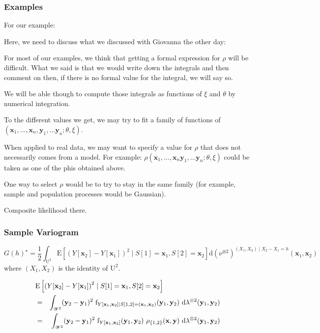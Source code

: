 \documentclass[12pt]{article}
\theoremstyle{definition}
\theoremstyle{remark}
\newcommand{\range}[1]{\mathscr{#1}}
\newcommand{\dominantU}{\nu}
\newcommand{\dominantY}{\lambda}
\newcommand{\derive}{\mathrm{d}}
\newcommand{\E}{\mathrm{E}}
\newcommand{\density}{\mathrm{f}}
\newcommand{\Semivariogram}{G}
\newcommand{\Sample}{S}
\newcommand{\Pop}{\mathrm{U}}
\newcommand{\position}{\mathbf{x}}
\newcommand{\Signal}{Y}
\newcommand{\signal}{\mathbf{y}}
\begin{document}
\subsubsection{Examples}



For our example:

Here, we need to discuss what we discussed with Giovanna the other day:

For most of our examples, we think that getting a formal expression for $\rho$ will be difficult.
What we said is that we would write down the integrals and then comment on then, if there is no formal value for the integral, we will say so.

We will be able though to compute those integrals as functions of $\xi$ and $\theta$ by numerical integration.

To the different values we get, we may try to fit a family of functions of $(\position_1,\ldots,\position_n, \signal_1,\ldots \signal_n;\theta,\xi)$.

When applied to real data, we may want to specify a value for $\rho$ that does not necessarily comes from a model. For example:
$\rho(\position_1,\ldots,\position_n\signal_1,\ldots\signal_n;\theta,\xi)$ could be taken as one of the phis obtained above.

One way to select $\rho$ would be to try to stay in the same family (for example, sample and population processes would be Gaussian). 

{\color{red} Composite likelihood there.}

\subsubsection{Sample Variogram}

$$\Semivariogram(h)^\star=\frac12\int_{\Pop^2} \E\left[\left(\Signal[\position_2]-\Signal[\position_1]\right)^2\mid \Sample[1]=\position_1,\Sample[2]=\position_2\right] \derive(\dominantU^{\otimes 2})^{(X_1,X_2)\mid X_2-X_1=h}(\position_1,\position_2)$$
where $(X_1,X_2)$ is the identity of $\Pop^2$.

\begin{eqnarray*}
\lefteqn{\E\left[\left(\Signal[\position_2]-\Signal[\position_1]\right)^2\mid \Sample[1]=\position_1,\Sample[2]=\position_2\right]}\\
&=&\int_{\range{\Signal}^2} (\signal_2-\signal_1)^2~
\density_{\Signal[\position_1,\position_2]\mid S[1,2]=(\position_1,\position_2)}(\signal_1,\signal_2)~
\derive\dominantY^{\otimes 2}(\signal_1,\signal_2) \\
&=&\int_{\range{\Signal}^2} (\signal_2-\signal_1)^2~ \density_{\Signal[\position_1,\position_2]}(\signal_1,\signal_2)~
\rho_{\{1,2\}}(\position,\signal)~
\derive\dominantY^{\otimes 2}(\signal_1,\signal_2) \\
\end{eqnarray*}
\end{document}
